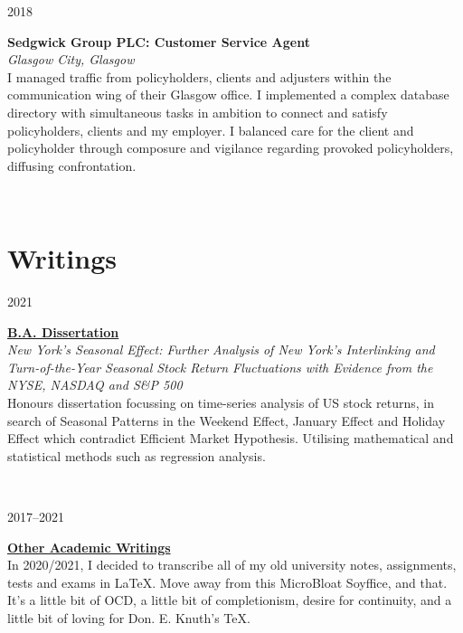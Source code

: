 \documentclass[11pt, english]{article}
\begin{document}
{\begin{minipage}[t]{.15\linewidth}
        \hfill    
        \textsc{2018}
\end{minipage}                    
\hfill\vline\hfill                
\begin{minipage}[t]{.80\linewidth}                
        \textbf{Sedgwick Group PLC: Customer Service Agent}\\ 
        \textit{Glasgow City, Glasgow}\\    
	I managed traffic from policyholders, clients and adjusters within the communication wing of their Glasgow office. I implemented a complex database directory with simultaneous tasks in ambition to connect and satisfy policyholders, clients and my employer. I balanced care for the client and policyholder through composure and vigilance regarding provoked policyholders, diffusing confrontation.
\end{minipage}\\
\vspace{0.25cm}

\newpage

\section{Writings}

\begin{minipage}[t]{.15\linewidth}
        \hfill                  
        \textsc{2021}
\end{minipage}
\hfill\vline\hfill
\begin{minipage}[t]{.80\linewidth}
	\href{http://lewisbritton.com/Coursework/Dissertation/AG436-Assignment.pdf}{\textbf{B.A. Dissertation}}\\
	\textit{New York's Seasonal Effect: Further Analysis of New York's Interlinking and Turn-of-the-Year Seasonal Stock Return Fluctuations with Evidence from the NYSE, NASDAQ and S\&P 500}\\
	Honours dissertation focussing on time-series analysis of US stock returns, in search of Seasonal Patterns in the Weekend Effect, January Effect and Holiday Effect which contradict Efficient Market Hypothesis. Utilising mathematical and statistical methods such as regression analysis. 
\end{minipage}\\
\vspace{0.25cm}

\begin{minipage}[t]{.15\linewidth}
        \hfill                  
        \textsc{2017--2021}
\end{minipage}
\hfill\vline\hfill
\begin{minipage}[t]{.80\linewidth}
	\href{http://lewisbritton.com/Library.html}{\textbf{Other Academic Writings}}\\
	In 2020/2021, I decided to transcribe all of my old university notes, assignments, tests and exams in {\LaTeX}. Move away from this MicroBloat Soyffice, and that. It's a little bit of OCD, a little bit of completionism, desire for continuity, and a little bit of loving for Don. E. Knuth's {\TeX}.
\end{minipage}

}
\end{document}
